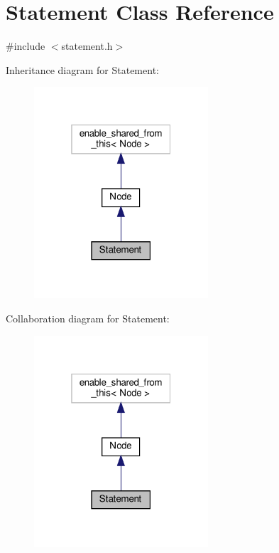 \hypertarget{class_statement}{}\section{Statement Class Reference}
\label{class_statement}


{\ttfamily \#include $<$statement.\+h$>$}



Inheritance diagram for Statement\+:\nopagebreak
\begin{figure}[H]
\begin{center}
\leavevmode
\includegraphics[width=184pt]{df/dcf/class_statement__inherit__graph}
\end{center}
\end{figure}


Collaboration diagram for Statement\+:\nopagebreak
\begin{figure}[H]
\begin{center}
\leavevmode
\includegraphics[width=184pt]{d0/ded/class_statement__coll__graph}
\end{center}
\end{figure}
